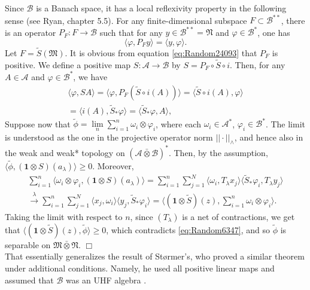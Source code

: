 Since $\mathcal{B}$ is a Banach space, it has a local
reflexivity property in the following sense (see Ryan\cite{Ryan2002}, chapter 5.5).
For any finite-dimensional subspace $F \subset \mathcal{B}^{**}$,
there is an operator $P_{F}: F \rightarrow \mathcal{B}$
such that for any $y \in \mathcal{B}^{**} = \mathfrak{N}$
and $\varphi \in \mathcal{B}^{*}$, one has
\begin{equation}
\label{eq:Random24093}
\langle \varphi, P_{F}y \rangle =\langle y, \varphi \rangle.
\end{equation}
Let $F = \tilde{S}(\mathfrak{M})$.
It is obvious from equation \eqref{eq:Random24093} that $P_{F}$ is positive.
We define a positive map $S: \mathcal{A} \rightarrow \mathcal{B}$ by
$S = P_{F} \circ \tilde{S} \circ i$. Then,
for any $A \in \mathcal{A}$ and $\varphi \in \mathcal{B}^{*}$, we have
\begin{eqnarray}
\langle \varphi, SA \rangle =
\langle \varphi, P_{F} ( \tilde{S} \circ i (A)) \rangle =
\langle  \tilde{S} \circ i (A), \varphi \rangle \nonumber\\
=\langle i(A), \tilde{S}_{*} \varphi \rangle =
\langle \tilde{S}_{*} \varphi, A \rangle,
\end{eqnarray}
Suppose now that
$\tilde{\phi} = \lim \limits_{n} \sum_{i=1}^{n}\omega_{i} \otimes \varphi_{i}$,
where each $\omega_{i} \in \mathcal{A}^{*}$,
$\varphi_{i} \in \mathcal{B}^{*}$.
The limit is understood as the one in the projective
operator norm $|| \cdot ||_{\wedge}$, and hence also in the weak and weak* topology on
$(\mathcal{A} \bar{\otimes} \mathcal{B})^{*}$. Then, by the assumption,
$\langle \tilde{\phi},(\mathbf{1} \otimes S) (a_{\lambda}) \rangle \geq 0$. Moreover,
\begin{eqnarray}
\sum \limits_{i=1}^{n}\langle \omega_{i} \otimes \varphi_{i},
(\mathbf{1} \otimes S)(a_{\lambda}) \rangle =
\sum \limits_{i=1}^{n} \sum \limits_{j=1}^{N}
\langle \omega_{i} , T_{\lambda} x_{j} \rangle
\langle \tilde{S}_{*} \varphi_{i}, T_{\lambda} y_{j}\rangle \nonumber\\
\stackrel{\lambda}{\longrightarrow}\sum \limits_{i=1}^{n} \sum \limits_{j=1}^{N}
\langle  x_{j}, \omega_{i} \rangle\langle  y_{j},  \tilde{S}_{*} \varphi_{i} \rangle =
\langle (\mathbf{1} \otimes \tilde{S})(z),
\sum \limits_{i=1}^{n} \omega_{i} \otimes \varphi_{i} \rangle .    
\end{eqnarray}
Taking the limit with respect to $n$,
since $(T_{\lambda})$ is a net of contractions, we get that
$\langle (\mathbf{1} \otimes \tilde{S}) (z) ,
\tilde{\phi}\rangle \geq 0$, which contradicts \eqref{eq:Random6347},
and so $\tilde{\phi}$ is separable on
$\mathfrak{M} \bar{\otimes} \mathfrak{N}$. $\Box$ \\
That essentially generalizes the result of St{\o}rmer's, who proved a similar theorem under
additional conditions. Namely, he used all positive linear maps and assumed that $\mathcal{B}$
was an UHF algebra \cite{Stormer2009}.

